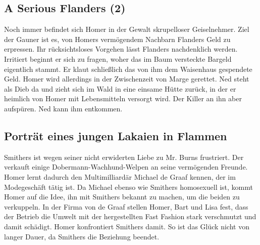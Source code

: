 
\subsection{A Serious Flanders (2)}
Noch immer befindet sich Homer in der Gewalt skrupelloser Geiselnehmer. Ziel der Gauner ist es, von Homers vermögendem Nachbarn Flanders Geld zu erpressen. Ihr rücksichtsloses Vorgehen lässt Flanders nachdenklich werden. Irritiert beginnt er sich zu fragen, woher das im Baum versteckte Bargeld eigentlich stammt. Er klaut schließlich das von ihm dem Waisenhaus gespendete Geld. Homer wird allerdings in der Zwischenzeit von Marge gerettet. Ned steht als Dieb da und zieht sich im Wald in eine einsame Hütte zurück, in der er heimlich von Homer mit Lebensmitteln versorgt wird. Der Killer an ihn aber aufspüren. Ned kann ihm entkommen.


\subsection{Porträt eines jungen Lakaien in Flammen}
Smithers ist wegen seiner nicht erwiderten Liebe zu Mr. Burns frustriert. Der verkauft einige Dobermann-Wachhund-Welpen an seine vermögenden Freunde. Homer lernt dadurch den Multimilliardär Michael de Graaf kennen, der im Modegeschäft tätig ist. Da Michael ebenso wie Smithers homosexuell ist, kommt Homer auf die Idee, ihn mit Smithers bekannt zu machen, um die beiden zu verkuppeln.
In der Firma von de Graaf stellen Homer, Bart und Lisa fest, dass der Betrieb die Umwelt mit der hergestellten Fast Fashion stark verschmutzt und damit schädigt. Homer konfrontiert Smithers damit. So ist das Glück nicht von langer Dauer, da Smithers die Beziehung beendet.

